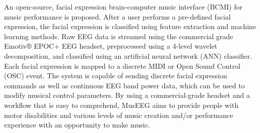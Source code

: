 An open-source, facial expression brain-computer music interface (BCMI) for music performance is proposed. After a user performs a pre-defined facial expression, the facial expression is classified using feature extraction and machine learning methods. Raw EEG data is streamed using the commercial grade Emotiv® EPOC+ EEG headset, preprocessed using a 4-level wavelet decomposition, and classified using an artificial neural network (ANN) classifier. Each facial expression is mapped to a discrete MIDI or Open Sound Control (OSC) event. The system is capable of sending discrete facial expression commands as well as continuous EEG band power data, which can be used to modify musical control parameters. By using a commercial-grade headset and a workflow that is easy to comprehend, MusEEG aims to provide people with motor disabilities and various levels of music creation and/or performance experience with an opportunity to make music.